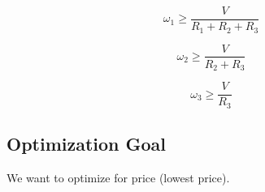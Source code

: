 \documentclass{article}
\begin{document}
\begin{equation}
    \omega_1 \geq \frac{V}{R_1 + R_2 + R_3}
\end{equation}

\begin{equation}
    \omega_2 \geq \frac{V}{R_2 + R_3}
\end{equation}

\begin{equation}
    \omega_3 \geq \frac{V}{R_3}
\end{equation}

\FloatBarrier
\subsection{Optimization Goal}

We want to optimize for price (lowest price).
\end{document}
